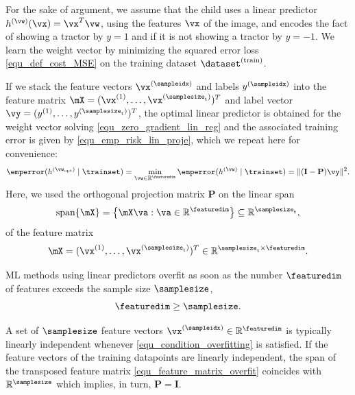 \documentclass[12pt]{report}
\begin{document}
For the sake of argument, we assume that the child uses a linear predictor 
$h^{(\vw)}(\vx) = \vx^{T} \vw$, using the features $\vx$ of the image, and encodes 
the fact of showing a tractor by $y=1$ and if it is not showing a tractor by $y=-1$. 
We learn the weight vector by minimizing the squared error loss \eqref{equ_def_cost_MSE} 
on the training dataset $\dataset^{(\rm train)}$.

If we stack the feature vectors $\vx^{(\sampleidx)}$ and labels $y^{(\sampleidx)}$ into 
the feature matrix $\mX=(\vx^{(1)},\ldots,\vx^{(\samplesize_{\rm t})})^{T}$ and label 
vector $\vy=(y^{(1)},\ldots,y^{(\samplesize_{\rm t})})^{T}$, the optimal linear predictor 
is obtained for the weight vector solving \eqref{equ_zero_gradient_lin_reg} 
and the associated training error is given by \eqref{equ_emp_risk_lin_proje}, which 
we repeat here for convenience: 
\begin{equation}
\emperror(h^{(\vw_{\rm opt})} \mid \trainset) = \min_{\vw \in \mathbb{R}^{\featuredim}} \emperror(h^{(\vw)} \mid \trainset) = \|  (\mathbf{I}- \mathbf{P}) \vy \|^{2}.
\end{equation} 
Here, we used the orthogonal projection matrix $\mathbf{P}$ on the linear span 
\begin{equation} 
\nonumber
{\rm span}\{ \mX \} = \big\{  \mX \va : \va \in \mathbb{R}^{\featuredim} \big\} \subseteq \mathbb{R}^{\samplesize_{\rm t}} , 
\end{equation}
of the feature matrix 
\begin{equation} 
\label{equ_feature_matrix_overfit}
\mX = (\vx^{(1)},\ldots,\vx^{(\samplesize_{\rm t})})^{T} \in \mathbb{R}^{  \samplesize_{\rm t} \times \featuredim}. 
\end{equation} 

ML methods using linear predictors overfit as soon as the 
number $\featuredim$ of features exceeds the sample size $\samplesize$,
\begin{equation} 
\label{equ_condition_overfitting}
\featuredim  \geq \samplesize. 
\end{equation} 

A set of $\samplesize$ feature vectors $\vx^{(\sampleidx)} \in \mathbb{R}^{\featuredim}$ 
is typically linearly independent whenever \eqref{equ_condition_overfitting} is satisfied. 
If the feature vectors of the training datapoints are linearly independent, 
the span of the transposed feature matrix \eqref{equ_feature_matrix_overfit} 
coincides with $\mathbb{R}^{\samplesize}$ which implies, in turn, $\mathbf{P} = \mathbf{I}$. 
\end{document}
